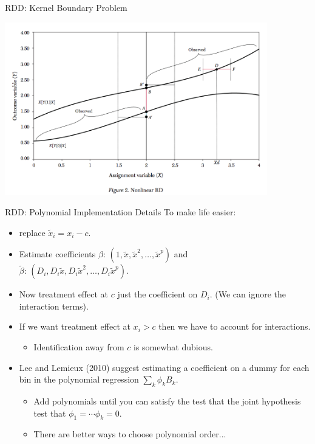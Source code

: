 \begin{frame}{RDD: Kernel Boundary Problem}
\begin{center}
\includegraphics[width=4.5in]{./resources/ll-fig2}
\end{center}
\end{frame}

\begin{frame}{RDD: Polynomial Implementation Details}
To make life easier:
\begin{itemize}
\item replace $\tilde{x}_i = x_i - c$.
\item Estimate coefficients $\beta$: $(1, \tilde{x}, \tilde{x}^2, \ldots, \tilde{x}^p)$ and\\
 $\tilde{\beta}$: $(D_i, D_i \tilde{x},D_i \tilde{x}^2, \ldots, D_i \tilde{x}^p)$.
 \item Now treatment effect at $c$ just the coefficient on $D_i$. (We can ignore the interaction terms).
 \item If we want treatment effect at $x_i > c$ then we have to account for interactions.
 \begin{itemize}
 \item Identification away from $c$ is somewhat dubious.
\end{itemize}
\item Lee and Lemieux (2010) suggest estimating a coefficient on a dummy for each bin in the polynomial regression $\sum_{k} \phi_k B_k$.
 \begin{itemize}
 \item Add polynomials until you can satisfy the test that the joint hypothesis test that $\phi_1 = \cdots \phi_k= 0$.
\item There are better ways to choose polynomial order...
\end{itemize}
\end{itemize}
\end{frame}

